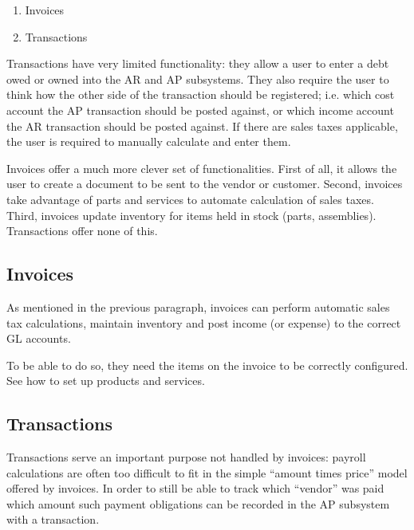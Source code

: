 \begin{enumerate}
\item Invoices
\item Transactions
\end{enumerate}

Transactions have very limited functionality: they allow a user to enter
a debt owed or owned into the AR and AP subsystems. They also require the
user to think how the other side of the transaction should be registered;
i.e. which cost account the AP transaction should be posted against, or
which income account the AR transaction should be posted against. If there
are sales taxes applicable, the user is required to manually calculate and
enter them.

Invoices offer a much more clever set of functionalities. First of all, it
allows the user to create a document to be sent to the vendor or customer.
Second, invoices take advantage of parts and services
to automate calculation of sales taxes. Third, invoices update inventory
for items held in stock (parts, assemblies). Transactions offer none of this.

\subsection{Invoices}
\label{subsec-workflows-invoicing-manual-entry-invoices}


As mentioned in the previous paragraph, invoices can perform automatic
sales tax calculations, maintain inventory and post income (or expense)
to the correct GL accounts.

To be able to do so, they need the items on the invoice to be correctly
configured. See  how to set up products
and services.




\subsection{Transactions}
\label{subsec-workflows-invoicing-manual-entry-transactions}


Transactions serve an important purpose not handled by invoices: payroll
calculations are often too difficult to fit in the simple ``amount times price''
model offered by invoices. In order to still be able to track which ``vendor''
was paid which amount such payment obligations can be recorded in the AP subsystem
with a transaction.

